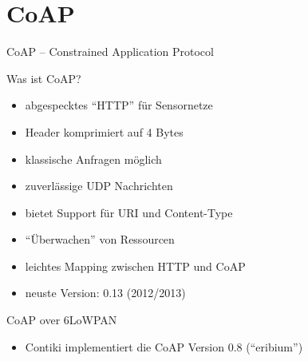 
\section{CoAP}

\begin{frame}{CoAP -- Constrained Application Protocol}

\begin{block}{Was ist CoAP?}
\begin{itemize}
\item 	abgespecktes \enquote{HTTP} für Sensornetze
\item 	Header komprimiert auf 4 Bytes
\item 	klassische Anfragen möglich 
\item 	zuverlässige UDP Nachrichten 
\item 	bietet Support für URI und Content-Type
\item 	\enquote{Überwachen} von Ressourcen
\item 	leichtes Mapping zwischen HTTP und CoAP
\item 	neuste Version: 0.13 (2012/2013)
\end{itemize}
\end{block}

\begin{block}{CoAP over 6LoWPAN}
\begin{itemize}
\item 	Contiki implementiert die CoAP Version 0.8 (\enquote{eribium})
\end{itemize}
\end{block}

\end{frame}

